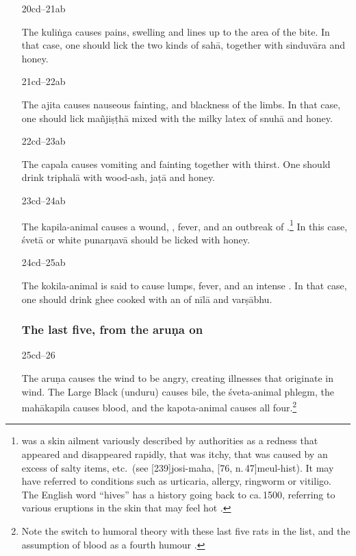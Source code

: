 \begin{translation}
\begin{itemize}
\item[20cd--21ab]

The \Gls{kuliṅga} causes pains, swelling and lines up to the area of the bite.
In that case, one should lick the two kinds of \gls{sahā}, together with 
\gls{sinduvāra} and honey.  

\item[21cd--22ab]

The \Gls{ajita} causes nauseous fainting,  and 
blackness of the limbs. 
In that case, one should lick \gls{mañjiṣṭhā} mixed with the milky latex of 
\gls{snuhā} and honey. 


\item[22cd--23ab]

The \Gls{capala} causes vomiting and fainting together with thirst.
One should drink \gls{triphalā} with wood-ash, \gls{jaṭā} and 
honey.

\item [23cd--24ab]

The \Gls{kapila-animal} causes a wound, , fever, and an
outbreak of .\footnote{\label{kotha} was a skin
    ailment variously described by authorities as a redness that appeared
    and disappeared rapidly, that was itchy, that was caused by an excess
    of salty items, etc.\ (see [239]{josi-maha},
    [76, n.\,47]{meul-hist}). It may have referred to
    conditions such as urticaria, allergy, ringworm or vitiligo. The English word
    “hives” has a 
    history going back to ca.\,1500, referring to various eruptions in the skin that 
    may feel hot \citep[s.v.\ 
    “\href{https://doi.org/10.1093/OED/3255856400}{hives (n.)}”]{OED}.} In 
    this
    case, \gls{śvetā} or white \gls{punarṇavā} should be licked with
    honey.

\item[24cd--25ab]

The \Gls{kokila-animal} is said to cause lumps, fever, and an intense 
\se{dāha}{feeling of heat}. 
In that case, one should drink  ghee cooked with an 
of  \gls{nīlā} and \gls{varṣābhu}. 


\subsubsection{The last five, from the \Gls{aruṇa} on}
\item[25cd--26]

The \Gls{aruṇa} causes the wind to be angry, creating illnesses that
originate in wind. The Large Black (\gls{unduru}) causes bile, the
\Gls{śveta-animal} phlegm, the \Gls{mahākapila} causes blood, and the
\Gls{kapota-animal} causes all four.\footnote{Note the switch to humoral
    theory with these last five rats in the list, and the assumption of blood as a 
    fourth humour .}


\end{itemize}
\end{translation}
